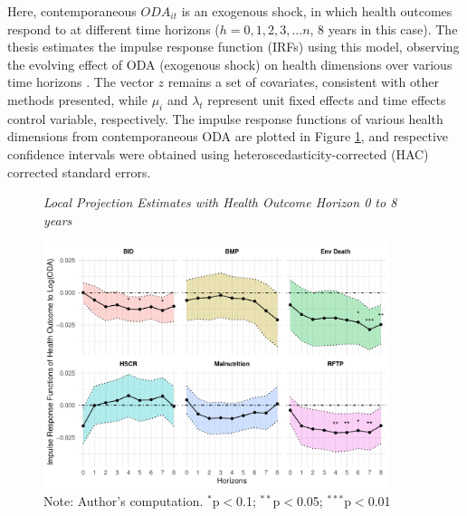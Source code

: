Here, contemporaneous $ODA_{it}$ is an exogenous shock, in which health outcomes respond to at different time horizons ($h = 0, 1, 2, 3, ...n$, 8 years in this case). The thesis estimates the impulse response function (IRFs) using this model, observing the evolving effect of ODA (exogenous shock) on health dimensions over various time horizons \parencite[see method in][]{jorda2005estimation, montiel2021local}. The vector $z$ remains a set of covariates, consistent with other methods presented, while $\mu_i$ and $\lambda_t$ represent unit fixed effects and time effects control variable, respectively. The impulse response functions of various health dimensions from contemporaneous ODA are plotted in Figure \ref{fig:Local_projection}, and respective confidence intervals were obtained using heteroscedasticity-corrected (HAC) corrected standard errors.
\begin{figure}[H]
\captionsetup{justification=justified,singlelinecheck=false}
\caption{\textit{Local Projection Estimates with Health Outcome Horizon 0 to 8 years}}
    \centering \includegraphics[width = 0.9\textwidth]{Results_outputs/Models/Local_Projt.pdf}
    \caption*{\footnotesize{Note: Author's computation. $^{*}$p$<$0.1; $^{**}$p$<$0.05; $^{***}$p$<$0.01}}
    \label{fig:Local_projection}
\end{figure}

